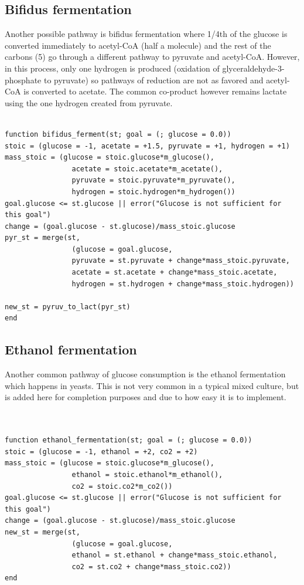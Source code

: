 \documentclass[11pt]{article}
\begin{document}
\subsection{Bifidus fermentation}
\label{sec:orgcd7d26f}
Another possible pathway is bifidus fermentation where 1/4th of the glucose is converted immediately to acetyl-CoA (half a molecule) and the rest of the carbons (5) go through a different pathway to pyruvate and acetyl-CoA. However, in this process, only one hydrogen is produced (oxidation of glyceraldehyde-3-phosphate to pyruvate) so pathways of reduction are not as favored and acetyl-CoA is converted to acetate. The common co-product however remains lactate using the one hydrogen created from pyruvate.

\begin{verbatim}

function bifidus_ferment(st; goal = (; glucose = 0.0))
stoic = (glucose = -1, acetate = +1.5, pyruvate = +1, hydrogen = +1)
mass_stoic = (glucose = stoic.glucose*m_glucose(),
                acetate = stoic.acetate*m_acetate(),
                pyruvate = stoic.pyruvate*m_pyruvate(),
                hydrogen = stoic.hydrogen*m_hydrogen())
goal.glucose <= st.glucose || error("Glucose is not sufficient for this goal")
change = (goal.glucose - st.glucose)/mass_stoic.glucose
pyr_st = merge(st,
                (glucose = goal.glucose,
                pyruvate = st.pyruvate + change*mass_stoic.pyruvate,
                acetate = st.acetate + change*mass_stoic.acetate,
                hydrogen = st.hydrogen + change*mass_stoic.hydrogen))

new_st = pyruv_to_lact(pyr_st)
end

\end{verbatim}

\subsection{Ethanol fermentation}
\label{sec:org22fde92}
Another common pathway of glucose consumption is the ethanol fermentation which happens in yeasts. This is not very common in a typical mixed culture, but is added here for completion purposes and due to how easy it is to implement.

\begin{verbatim}


function ethanol_fermentation(st; goal = (; glucose = 0.0))
stoic = (glucose = -1, ethanol = +2, co2 = +2)
mass_stoic = (glucose = stoic.glucose*m_glucose(),
                ethanol = stoic.ethanol*m_ethanol(),
                co2 = stoic.co2*m_co2())
goal.glucose <= st.glucose || error("Glucose is not sufficient for this goal")
change = (goal.glucose - st.glucose)/mass_stoic.glucose
new_st = merge(st,
                (glucose = goal.glucose,
                ethanol = st.ethanol + change*mass_stoic.ethanol,
                co2 = st.co2 + change*mass_stoic.co2))
end

\end{verbatim}
\end{document}
